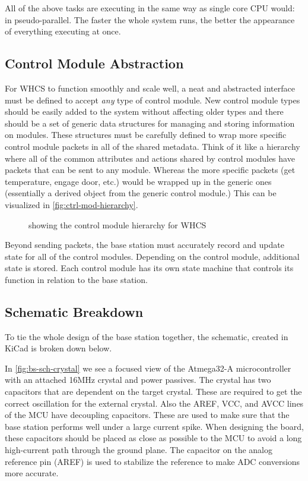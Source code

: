 \documentclass[draft,twocolumn,letterpaper,10pt]{IEEEtran}
\newcommand{\ucffig}[3]{
\begin{figure}[h]
\centering
\makebox[\linewidth][c]{
#2
}
\caption{#3}
\label{#1}
\end{figure}
}
\newcommand{\ucfgfx}[4][scale=1.0]{
\ucffig{#2}{\texttt{[image: \#3]}}{#4}
}
\begin{document}
All of the above tasks are executing in the same way as single core CPU
would: in pseudo-parallel. The faster the whole system runs, the better the
appearance of everything executing at once.

\subsection{Control Module Abstraction}
For WHCS to function smoothly and scale well, a neat and abstracted interface
must be defined to accept \emph{any} type of control module. New control module
types should be easily added to the system without affecting older types and
there should be a set of generic data structures for managing and storing
information on modules. These structures must be carefully defined to wrap more
specific control module packets in all of the shared metadata. Think of it like
a hierarchy where all of the common attributes and actions shared by control
modules have packets that can be sent to any module. Whereas the more specific
packets (get temperature, engage door, etc.) would be wrapped up in the generic
ones (essentially a derived object from the generic control module.) This can
be visualized in \autoref{fig:ctrl-mod-hierarchy}.

\ucfgfx[width=\linewidth]{fig:ctrl-mod-hierarchy}{control-module-hierarchy}{showing the control
module hierarchy for WHCS}

Beyond sending packets, the base station must accurately record and update
state for all of the control modules. Depending on the control module,
additional state is stored. Each control module has its own state machine that
controls its function in relation to the base station.

\subsection{Schematic Breakdown}
To tie the whole design of the base station together, the schematic, created in
KiCad is broken down below.

In \autoref{fig:bs-sch-crystal} we see a focused view of the Atmega32-A
microcontroller with an attached 16MHz crystal and power passives. The crystal
has two capacitors that are dependent on the target crystal. These are required
to get the correct oscillation for the external crystal. Also the AREF, VCC,
and AVCC lines of the MCU have decoupling capacitors. These are used to make
sure that the base station performs well under a large current spike. When
designing the board, these capacitors should be placed as close as possible to
the MCU to avoid a long high-current path through the ground plane. The
capacitor on the analog reference pin (AREF) is used to stabilize the reference
to make ADC conversions more accurate.
\end{document}
